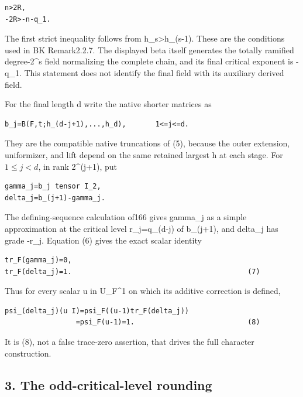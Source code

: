 \begin{Verbatim}[fontsize=\small,breaklines=true,breakanywhere=true]
n>2R,
-2R>-n-q_1.
\end{Verbatim}

The first strict inequality follows from h\_s\textgreater h\_(s-1).
These are the conditions used in BK Remark2.2.7. The displayed beta
itself generates the totally ramified degree-2\^{}s field normalizing
the complete chain, and its final critical exponent is -q\_1. This
statement does not identify the final field with its auxiliary derived
field.

For the final length d write the native shorter matrices as

\begin{Verbatim}[fontsize=\small,breaklines=true,breakanywhere=true]
b_j=B(F,t;h_(d-j+1),...,h_d),       1<=j<=d.
\end{Verbatim}

They are the compatible native truncations of (5), because the outer
extension, uniformizer, and lift depend on the same retained largest h
at each stage. For \(1\le j<d\), in rank 2\^{}(j+1), put

\begin{Verbatim}[fontsize=\small,breaklines=true,breakanywhere=true]
gamma_j=b_j tensor I_2,
delta_j=b_(j+1)-gamma_j.
\end{Verbatim}

The defining-sequence calculation of166 gives gamma\_j as a simple
approximation at the critical level r\_j=q\_(d-j) of b\_(j+1), and
delta\_j has grade -r\_j. Equation (6) gives the exact scalar identity

\begin{Verbatim}[fontsize=\small,breaklines=true,breakanywhere=true]
tr_F(gamma_j)=0,
tr_F(delta_j)=1.                                          (7)
\end{Verbatim}

Thus for every scalar u in U\_F\^{}1 on which its additive correction is
defined,

\begin{Verbatim}[fontsize=\small,breaklines=true,breakanywhere=true]
psi_(delta_j)(u I)=psi_F((u-1)tr_F(delta_j))
                 =psi_F(u-1)=1.                           (8)
\end{Verbatim}

It is (8), not a false trace-zero assertion, that drives the full
character construction.

\hypertarget{dyadic_character-the-odd-critical-level-rounding}{%
\subsection{3. The odd-critical-level
rounding}\label{dyadic_character-the-odd-critical-level-rounding}}

